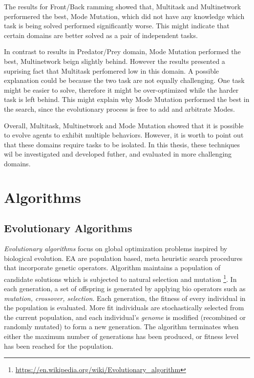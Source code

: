 \documentclass[format=acmsmall, review=false, screen=true]{acmart}
\begin{document}
The results for Front/Back ramming showed that, Multitask and Multinetwork performered the best, Mode Mutation, which did not have any knowledge which task is being solved performed significantly worse. This might indicate that certain domains are better solved as a pair of independent tasks.

In contrast to results in Predator/Prey domain, Mode Mutation performed the best, Multinetwork beign slightly behind. However the results presented a suprising fact that Multitask perfomered low in this domain. A possible explanation could be because the two task are not equally challenging. One task might be easier to solve, therefore it might be over-optimized while the harder task is left behind. This might explain why Mode Mutation performed the best in the search, since the evolutionary process is free to add and arbitrate Modes.

Overall, Multitask, Multinetwork and Mode Mutation showed that it is possible to evolve agents to exhibit multiple behaviors. However, it is worth to point out that these domains require tasks to be isolated. In this thesis, these techniques wil be investigated and developed futher, and evaluated in more challenging domains.


\section{Algorithms}

\subsection{Evolutionary Algorithms}

\emph{Evolutionary algorithms} focus on global optimization problems inspired by biological evolution. EA are population based, meta heuristic search procedures that incorporate genetic operators. Algorithm maintains a population of candidate solutions which is subjected to natural selection and mutation \footnote{\url{https://en.wikipedia.org/wiki/Evolutionary_algorithm}}. In each generation, a set of offspring is generated by applying bio operators such as \emph{mutation, crossover, selection}. Each generation, the fitness of every individual in the population is evaluated. More fit individuals are stochastically selected from the current population, and each individual's \emph{genome} is modified (recombined or randomly mutated) to form a new generation. The algorithm terminates when either the maximum number of generations has been produced, or fitness level has been reached for the population.
\end{document}
